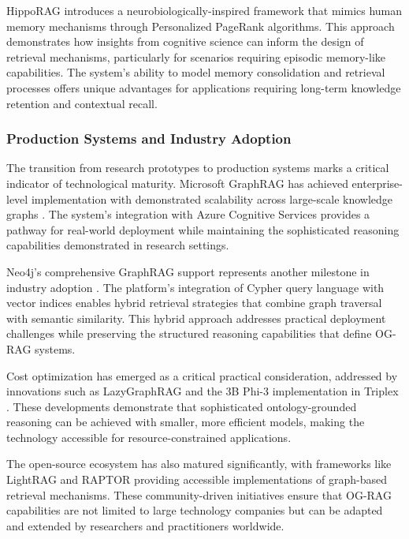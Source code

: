 HippoRAG \cite{bai2024hipporag} introduces a neurobiologically-inspired framework that mimics human memory mechanisms through Personalized PageRank algorithms. This approach demonstrates how insights from cognitive science can inform the design of retrieval mechanisms, particularly for scenarios requiring episodic memory-like capabilities. The system's ability to model memory consolidation and retrieval processes offers unique advantages for applications requiring long-term knowledge retention and contextual recall.

\subsubsection{Production Systems and Industry Adoption}

The transition from research prototypes to production systems marks a critical indicator of technological maturity. Microsoft GraphRAG has achieved enterprise-level implementation with demonstrated scalability across large-scale knowledge graphs \cite{edge2024graphrag}. The system's integration with Azure Cognitive Services provides a pathway for real-world deployment while maintaining the sophisticated reasoning capabilities demonstrated in research settings.

Neo4j's comprehensive GraphRAG support represents another milestone in industry adoption \cite{neo4j2024graphrag}. The platform's integration of Cypher query language with vector indices enables hybrid retrieval strategies that combine graph traversal with semantic similarity. This hybrid approach addresses practical deployment challenges while preserving the structured reasoning capabilities that define OG-RAG systems.

Cost optimization has emerged as a critical practical consideration, addressed by innovations such as LazyGraphRAG \cite{guo2024lazygraphrag} and the 3B Phi-3 implementation in Triplex \cite{zhang2024triplex}. These developments demonstrate that sophisticated ontology-grounded reasoning can be achieved with smaller, more efficient models, making the technology accessible for resource-constrained applications.

The open-source ecosystem has also matured significantly, with frameworks like LightRAG \cite{guo2024lightrag} and RAPTOR \cite{sarthi2024raptor} providing accessible implementations of graph-based retrieval mechanisms. These community-driven initiatives ensure that OG-RAG capabilities are not limited to large technology companies but can be adapted and extended by researchers and practitioners worldwide.

